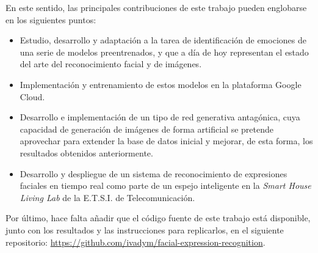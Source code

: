 En este sentido, las principales contribuciones de este trabajo pueden englobarse en los siguientes puntos:
\begin{itemize}
  \item Estudio, desarrollo y adaptación a la tarea de identificación de emociones de una serie de modelos preentrenados, y que a día de hoy representan el estado del arte del reconocimiento facial y de imágenes.
  \item Implementación y entrenamiento de estos modelos en la plataforma Google Cloud.
  \item Desarrollo e implementación de un tipo de red generativa antagónica, cuya capacidad de generación de imágenes de forma artificial se pretende aprovechar para extender la base de datos inicial y mejorar, de esta forma, los resultados obtenidos anteriormente.
  \item Desarrollo y despliegue de un sistema de reconocimiento de expresiones faciales en tiempo real como parte de un espejo inteligente en la \textit{Smart House Living Lab} de la E.T.S.I. de Telecomunicación.
\end{itemize}

Por último, hace falta añadir que el código fuente de este trabajo está disponible, junto con los resultados y las instrucciones para replicarlos, en el siguiente repositorio: \url{https://github.com/ivadym/facial-expression-recognition}.